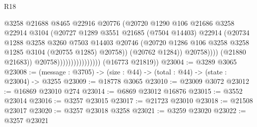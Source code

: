 \begin{lexlean}{R18}
\begin{coremodule}
                                              @3258
                                              @21688
                                              @8465
                                              @22916
                                              @20776
                                              (@20720
                                                @1290
                                                @106
                                                @21686
                                                @3258
                                                @22914
                                                @3104
                                                (@20727
                                                  @1289
                                                  @3551
                                                  @21685
                                                  (@7504 @14403)
                                                  @22914
                                                  (@20734
                                                    @1288
                                                    @3258
                                                    @3260
                                                    @7503
                                                    @14403
                                                    @20746
                                                    (@20720
                                                      @1286
                                                      @106
                                                      @3258
                                                      @3258
                                                      @1285
                                                      @3104
                                                      (@20755 @1285)
                                                      @20758))
                                                  (@20762 @1284))
                                                @20758))))
                                        (@21880 @21683))
                                      @20758))))))))))))))))
      (@16773 @21819))
@23004 := @3289 @3065
@23008 := (message : @3705) -> (size : @44) -> (total : @44) -> (state : @23004) -> @3255
@23009 := @18778 @3065
@23010 := @23009 @3072
@23012 := @16869 @23010 @274
@23014 := @6869 @23012 @16876
@23015 := @3552 @23014
@23016 := @3257 @23015
@23017 := @21723 @23010
@23018 := @21508 @23017
@23020 := @3257 @23018 @3258
@23021 := @3259 @23020
@23022 := @3257 @23021

\end{coremodule}
\end{lexlean}
